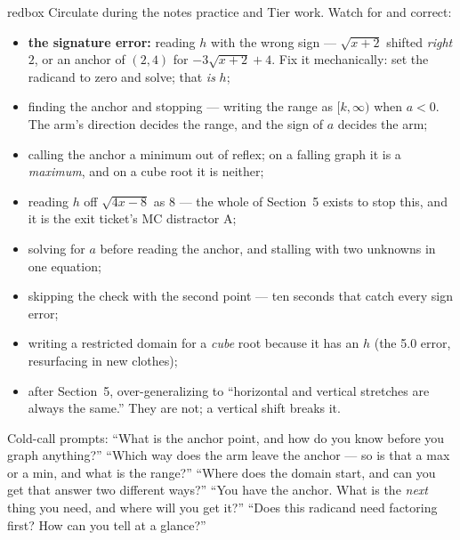 \documentclass[10pt]{article}
\begin{document}
\begin{skillbox}{redbox}
Circulate during the notes practice and Tier work. Watch for and correct:
\begin{itemize}[leftmargin=1.2em, nosep]
  \item \textbf{the signature error:} reading $h$ with the wrong sign --- $\sqrt{x+2}$ shifted \emph{right} $2$, or an anchor of $(2,4)$ for $-3\sqrt{x+2}+4$. Fix it mechanically: set the radicand to zero and solve; that \emph{is} $h$;
  \item finding the anchor and stopping --- writing the range as $[k,\infty)$ when $a<0$. The arm's direction decides the range, and the sign of $a$ decides the arm;
  \item calling the anchor a minimum out of reflex; on a falling graph it is a \emph{maximum}, and on a cube root it is neither;
  \item reading $h$ off $\sqrt{4x-8}$ as $8$ --- the whole of Section~5 exists to stop this, and it is the exit ticket's MC distractor A;
  \item solving for $a$ before reading the anchor, and stalling with two unknowns in one equation;
  \item skipping the check with the second point --- ten seconds that catch every sign error;
  \item writing a restricted domain for a \emph{cube} root because it has an $h$ (the 5.0 error, resurfacing in new clothes);
  \item after Section~5, over-generalizing to ``horizontal and vertical stretches are always the same.'' They are not; a vertical shift breaks it.
\end{itemize}
Cold-call prompts: ``What is the anchor point, and how do you know before you graph anything?''
``Which way does the arm leave the anchor --- so is that a max or a min, and what is the range?''
``Where does the domain start, and can you get that answer two different ways?'' ``You have the
anchor. What is the \emph{next} thing you need, and where will you get it?'' ``Does this radicand
need factoring first? How can you tell at a glance?''
\end{skillbox}
\end{document}
